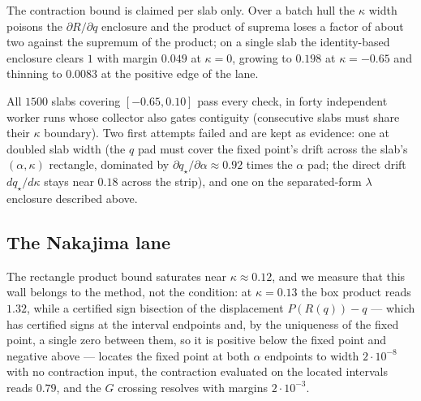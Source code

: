 \documentclass[11pt]{article}
\theoremstyle{remark}
\begin{document}
The contraction bound is claimed per slab only.  Over a batch hull
the $\kappa$ width poisons the $\partial R/\partial q$ enclosure and
the product of suprema loses a factor of about two against the
supremum of the product; on a single slab the identity-based
enclosure clears $1$ with margin $0.049$ at $\kappa=0$, growing to
$0.198$ at $\kappa=-0.65$ and thinning to $0.0083$ at the positive
edge of the lane.

All $1500$ slabs covering $[-0.65,0.10]$ pass every check, in forty
independent worker runs whose collector also gates contiguity
(consecutive slabs must share their $\kappa$ boundary).  Two first
attempts failed and are kept as evidence: one at doubled slab width
(the $q$ pad must cover the fixed point's drift across the slab's
$(\alpha,\kappa)$ rectangle, dominated by $\partial q_\star/\partial
\alpha\approx0.92$ times the $\alpha$ pad; the direct drift
$dq_\star/d\kappa$ stays near $0.18$ across the strip), and one on the
separated-form $\lambda$ enclosure described above.

\subsection{The Nakajima lane}\label{sec:nak}

The rectangle product bound saturates near $\kappa\approx0.12$, and
we measure that this wall belongs to the method, not the condition:
at $\kappa=0.13$ the box product reads $1.32$, while a certified sign
bisection of the displacement $P(R(q))-q$ --- which has certified signs at the interval endpoints and, by
the uniqueness of the fixed point, a single zero between them, so it
is positive below the fixed point and negative above --- locates the fixed point at both $\alpha$
endpoints to width $2\cdot10^{-8}$ with no contraction input, the
contraction evaluated on the located intervals reads $0.79$, and the
$G$ crossing resolves with margins $2\cdot10^{-3}$.
\end{document}
